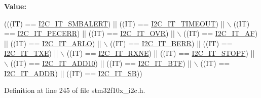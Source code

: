 {\bfseries Value\+:}
\begin{DoxyCode}
(((IT) == \hyperlink{group___i2_c__interrupts__definition_gab6049d4dd856a085127752e01ebb8120}{I2C\_IT\_SMBALERT}) || ((IT) == \hyperlink{group___i2_c__interrupts__definition_ga45ce34b163b456a5fb3833f1264d93b4}{I2C\_IT\_TIMEOUT}) || \(\backslash\)
                           ((IT) == \hyperlink{group___i2_c__interrupts__definition_ga23069e7787c4f052f34887c02bc44100}{I2C\_IT\_PECERR}) || ((IT) == 
      \hyperlink{group___i2_c__interrupts__definition_ga8e1e9e73d9057ccfce3493b5cf672833}{I2C\_IT\_OVR}) || \(\backslash\)
                           ((IT) == \hyperlink{group___i2_c__interrupts__definition_gabfb721ac5783336e6d2334f635e2e91b}{I2C\_IT\_AF}) || ((IT) == \hyperlink{group___i2_c__interrupts__definition_ga2439154bee2a45a4147921cec18177d1}{I2C\_IT\_ARLO}) || \(\backslash\)
                           ((IT) == \hyperlink{group___i2_c__interrupts__definition_gad9aec016c98df6dbb95a5c10b180c202}{I2C\_IT\_BERR}) || ((IT) == 
      \hyperlink{group___i2_c__interrupts__definition_gacb41229da2cd9460c3272cfb13aa29d3}{I2C\_IT\_TXE}) || \(\backslash\)
                           ((IT) == \hyperlink{group___i2_c__interrupts__definition_gac95135720c0de2fd01c44c3f7b6c81d4}{I2C\_IT\_RXNE}) || ((IT) == 
      \hyperlink{group___i2_c__interrupts__definition_ga741e098abb485b327c7668518117e415}{I2C\_IT\_STOPF}) || \(\backslash\)
                           ((IT) == \hyperlink{group___i2_c__interrupts__definition_ga8a9bc5a1dee3bbd41347b19cf117c0f3}{I2C\_IT\_ADD10}) || ((IT) == 
      \hyperlink{group___i2_c__interrupts__definition_gaef469fef934f655614b7cffd00b87ceb}{I2C\_IT\_BTF}) || \(\backslash\)
                           ((IT) == \hyperlink{group___i2_c__interrupts__definition_gaf68f1eda33dcb13626597f477d044025}{I2C\_IT\_ADDR}) || ((IT) == 
      \hyperlink{group___i2_c__interrupts__definition_gaec2fb9bbd0e1b128b4450b2a7b312896}{I2C\_IT\_SB}))
\end{DoxyCode}


Definition at line 245 of file stm32f10x\+\_\+i2c.\+h.

